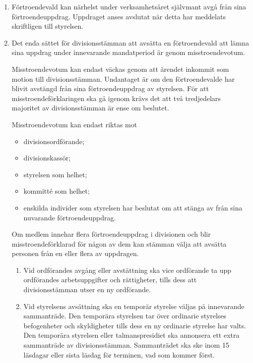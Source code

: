 \documentclass{dvd}
\begin{document}
	\begin{enumerate}[label=\arabic* §, ref=\arabic*]
		\item Förtroendevald kan närhelst under verksamhetsåret självmant avgå från sina förtroendeuppdrag.
		Uppdraget anses avslutat när detta har meddelats skriftligen till styrelsen.

		\item Det enda sättet för divisionsstämman att avsätta en förtroendevald att lämna sina uppdrag under innevarande mandatperiod är genom misstroendevotum.

		Misstroendevotum kan endast väckas genom att ärendet inkommit som motion till divisionsstämman.
		Undantaget är om den förtroendevalde har blivit avstängd från sina förtroendeuppdrag av styrelsen.
		För att misstroendeförklaringen ska gå igenom krävs det att två tredjedelars majoritet av divisionsstämman är ense om beslutet.

		Misstroendevotum kan endast riktas mot
		\begin{itemize}
			\item divisionsordförande;
			\item divisionskassör;
			\item styrelsen som helhet;
			\item kommitté som helhet;
			\item enskilda individer som styrelsen har beslutat om att stänga av från sina nuvarande förtroendeuppdrag.
		\end{itemize}

		Om medlem innehar flera förtroendeuppdrag i divisionen och blir misstroendeförklarad för någon av dem kan stämman välja att avsätta personen från en eller flera av uppdragen.

		\begin{enumerate}[label=\theenumi~\alph* §, ref=\theenumi~\alph*]
			\item Vid ordförandes avgång eller avstättning ska vice ordförande ta upp ordförandes arbetsuppgifter och rättigheter, tills dess att divisionsstämman utser en ny ordförande.

			\item 
		Vid styrelsens avsättning ska en temporär styrelse väljas på innevarande sammanträde.
		Den temporära styrelsen tar över ordinarie styrelses befogenheter och skyldigheter tills dess en ny ordinarie styrelse har valts.
		Den temporära styrelsen eller talmanspresidiet ska annonsera ett extra sammanträde av divisionsstämman.
		Sammanträdet ska ske inom 15 läsdagar eller sista läsdag för terminen, vad som kommer först.
		\end{enumerate}


\end{enumerate}
\end{document}
